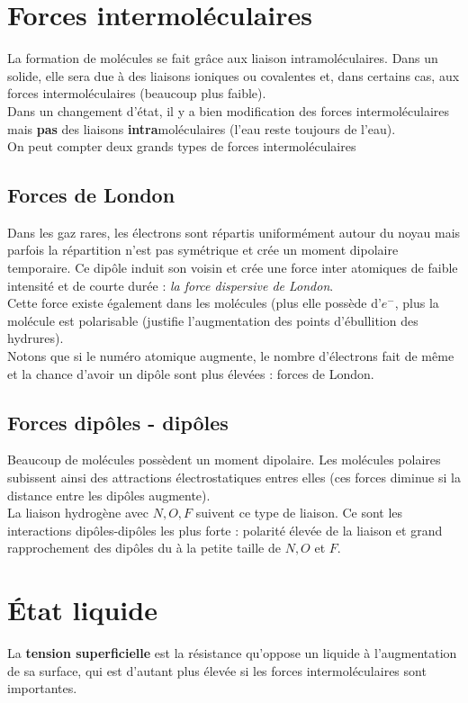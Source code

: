 \documentclass[british,french,11pt, a4paper, openany]{book}
\begin{document}
	\section{Forces intermoléculaires}
	La formation de molécules se fait grâce aux liaison intramoléculaires. Dans un solide, elle sera due à des liaisons ioniques ou covalentes et, dans certains cas, aux forces intermoléculaires (beaucoup plus faible).\\
	
	Dans un changement d'état, il y a bien modification des forces intermoléculaires mais \textbf{pas} des liaisons \textbf{intra}moléculaires (l'eau reste toujours de l'eau).\\
	On peut compter deux grands types de forces intermoléculaires
	\subsection*{Forces de London}
	Dans les gaz rares, les électrons sont répartis uniformément autour du noyau mais parfois la répartition n'est pas symétrique et crée un moment dipolaire temporaire. Ce dipôle induit son voisin et crée une force inter atomiques de faible intensité et de courte durée : \textit{la force dispersive de London}.\\
	
	Cette force existe également dans les molécules (plus elle possède d'$e^-$, plus la molécule est polarisable (justifie l'augmentation des points d'ébullition des hydrures).\\
	Notons que si le numéro atomique augmente, le nombre d'électrons fait de même et la chance d'avoir un dipôle sont plus élevées : forces de London.
	
	\subsection*{Forces dipôles - dipôles}
	Beaucoup de molécules possèdent un moment dipolaire. Les molécules polaires subissent ainsi des attractions électrostatiques entres elles (ces forces diminue si la distance entre les dipôles augmente).\\
	
	La liaison hydrogène avec $N, O, F$ suivent ce type de liaison. Ce sont les interactions dipôles-dipôles les plus forte : polarité élevée de la liaison et grand rapprochement des dipôles du à la petite taille de $N, O$ et $F$.
	
	\section{État liquide}
	La \textbf{tension superficielle} est la résistance qu'oppose un liquide à l'augmentation de sa surface, qui est d'autant plus élevée si les forces intermoléculaires sont importantes.\\
	
\end{document}
